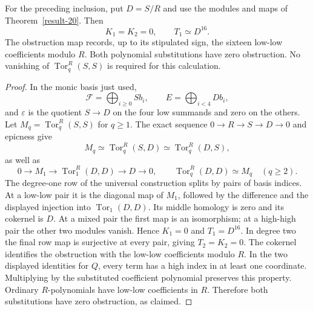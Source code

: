 \begin{proposition}\label{prop:forest-syzygy-invariants}
For the preceding inclusion, put $D=S/R$ and use the modules and
maps of Theorem~\ref{result-20}. Then
\[
                   K_1=K_2=0,\qquad T_1\simeq D^{16}.
\]
The obstruction map records, up to its stipulated sign, the sixteen
low-low coefficients modulo $R$. Both polynomial substitutions have
zero obstruction. No vanishing of $\operatorname{Tor}_q^R(S,S)$
is required for this calculation.
\end{proposition}
\begin{proof}
In the monic basis just used,
\[
 \mathcal F=\bigoplus_{i\ge0}Sb_i,\qquad
 E=\bigoplus_{i<4}Db_i,
\]
and $\varepsilon$ is the quotient $S\to D$ on the four low
summands and zero on the others. Let
$M_q=\operatorname{Tor}_q^R(S,S)$ for $q\ge1$.
The exact sequence $0\to R\to S\to D\to0$ and epicness give
\[
 M_q\simeq\operatorname{Tor}_q^R(S,D)
       \simeq\operatorname{Tor}_q^R(D,S),
\]
as well as
\[
 0\to M_1\to\operatorname{Tor}_1^R(D,D)\to D\to0,
 \qquad \operatorname{Tor}_q^R(D,D)\simeq M_q\quad(q\ge2).
\]
The degree-one row of the universal construction splits by pairs
of basis indices. At a low-low pair it is the diagonal map of
$M_1$, followed by the difference and the displayed injection into
$\operatorname{Tor}_1(D,D)$. Its middle homology is zero and its
cokernel is $D$. At a mixed pair the first map is an isomorphism;
at a high-high pair the other two modules vanish. Hence $K_1=0$
and $T_1=D^{16}$. In degree two the final row map is surjective
at every pair, giving $T_2=K_2=0$.
The cokernel identifies the obstruction with the low-low
coefficients modulo $R$. In the two displayed identities for $Q$,
every term has a high index in at least one coordinate. Multiplying
by the substituted coefficient polynomial preserves this property.
Ordinary $R$-polynomials have low-low coefficients in $R$.
Therefore both substitutions have zero obstruction, as claimed.
\end{proof}
